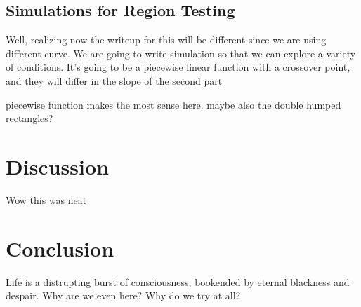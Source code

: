 \documentclass{article}
\begin{document}
\subsection{Simulations for Region Testing}

Well, realizing now the writeup for this will be different since we are using different curve. We are going to write simulation so that we can explore a variety of conditions. It's going to be a piecewise linear function with a crossover point, and they will differ in the slope of the second part

piecewise function makes the most sense here. maybe also the double humped rectangles?

\section{Discussion}

Wow this was neat

\section{Conclusion}

Life is a distrupting burst of consciousness, bookended by eternal blackness and despair. Why are we even here? Why do we try at all?
\end{document}
